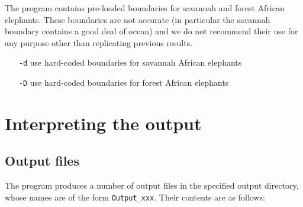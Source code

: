 \documentclass[10pt,titlepage,times,letterpaper]{article}
\begin{document}
The program contains pre-loaded boundaries for savannah and forest 
African elephants.  These boundaries are not accurate (in particular
the savannah boundary contains a good deal of ocean) and we do not
recommend their use for any purpose other than replicating previous
results.

\begin{itemize}
\item[{\tt -d}] use hard-coded boundaries for savannah African elephants
\item[{\tt -D}] use hard-coded boundaries for forest African elephants
\end{itemize}


\section{Interpreting the output} \label{interpret}

\subsection{Output files} \label{out}

The program produces a number of output files in the specified output directory,
whose names are of the form {\tt Output\_xxx}. Their
contents are as follows:
\end{document}
